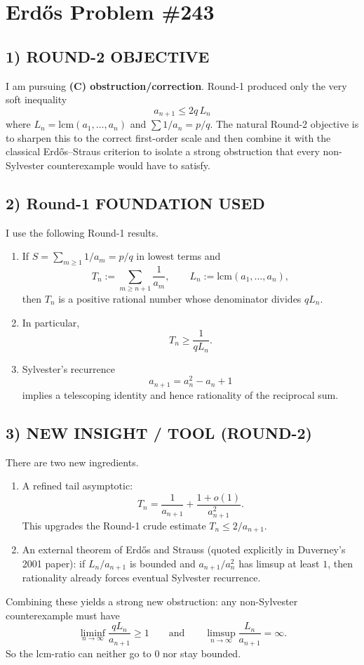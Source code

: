 \section{Erd\H{o}s Problem \#243}

\subsection*{1) ROUND-2 OBJECTIVE}
I am pursuing \textbf{(C) obstruction/correction}. Round-1 produced only the very soft inequality
\[
 a_{n+1}\le 2q\,L_n
\]
where $L_n=\mathrm{lcm}(a_1,\dots,a_n)$ and $\sum 1/a_n=p/q$. The natural Round-2 objective is to sharpen this to the correct first-order scale and then combine it with the classical Erd\H{o}s--Straus criterion to isolate a strong obstruction that every non-Sylvester counterexample would have to satisfy.

\subsection*{2) Round-1 FOUNDATION USED}
I use the following Round-1 results.
\begin{enumerate}
\item If $S=\sum_{m\ge 1}1/a_m=p/q$ in lowest terms and
\[
 T_n:=\sum_{m\ge n+1}\frac{1}{a_m},
\qquad L_n:=\mathrm{lcm}(a_1,\dots,a_n),
\]
then $T_n$ is a positive rational number whose denominator divides $qL_n$.
\item In particular,
\[
 T_n\ge \frac{1}{qL_n}.
\]
\item Sylvester's recurrence
\[
 a_{n+1}=a_n^2-a_n+1
\]
implies a telescoping identity and hence rationality of the reciprocal sum.
\end{enumerate}

\subsection*{3) NEW INSIGHT / TOOL (ROUND-2)}
There are two new ingredients.
\begin{enumerate}
\item A refined tail asymptotic:
\[
 T_n=\frac{1}{a_{n+1}}+\frac{1+o(1)}{a_{n+1}^2}.
\]
This upgrades the Round-1 crude estimate $T_n\le 2/a_{n+1}$.
\item An external theorem of Erd\H{o}s and Strauss (quoted explicitly in Duverney's 2001 paper): if $L_n/a_{n+1}$ is bounded and $a_{n+1}/a_n^2$ has limsup at least $1$, then rationality already forces eventual Sylvester recurrence.
\end{enumerate}
Combining these yields a strong new obstruction: any non-Sylvester counterexample must have
\[
 \liminf_{n\to\infty}\frac{qL_n}{a_{n+1}}\ge 1
\qquad\mbox{and}\qquad
 \limsup_{n\to\infty}\frac{L_n}{a_{n+1}}=\infty.
\]
So the lcm-ratio can neither go to $0$ nor stay bounded.

